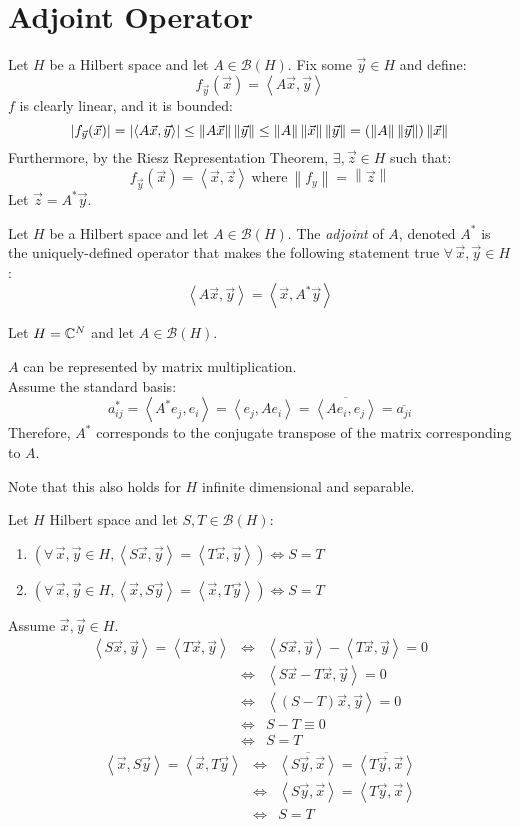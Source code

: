 \documentclass[letterpaper,12pt,fleqn]{article}
\newcommand{\mb}{\mathcal{B}}
\newcommand{\vx}{\vec{x}}
\newcommand{\vy}{\vec{y}}
\newcommand{\vz}{\vec{z}}
\newcommand{\norm}[1]{\left\|#1\right\|}
\newcommand{\inner}[1]{\left<#1\right>}
\newcommand{\conj}[1]{\overline{#1}}
\begin{document}
\section*{Adjoint Operator}

Let $H$ be a Hilbert space and let $A\in\mb(H)$. Fix some $\vy\in H$ and
define:
\[f_{\vy}(\vx)=\inner{A\vx,\vy}\]
$f$ is clearly linear, and it is bounded:
\[\abs{f_{\vy}(\vx)}=\abs{\inner{A\vx,\vy}}\le\norm{A\vx}\norm{\vy}\le
\norm{A}\norm{\vx}\norm{\vy}=(\norm{A}\norm{\vy})\norm{\vx}\]
Furthermore, by the Riesz Representation Theorem, $\exists,\vz\in H$ such
that:
\[f_{\vy}(\vx)=\inner{\vx,\vz}\ \mbox{where}\ \norm{f_y}=\norm{\vz}\]
Let $\vz=A^*\vy$.

\begin{definition}
  Let $H$ be a Hilbert space and let $A\in\mb(H)$. The \emph{adjoint} of $A$,
  denoted $A^*$ is the uniquely-defined operator that makes the following
  statement true $\forall\,\vx,\vy\in H$:
  \[\inner{A\vx,\vy}=\inner{\vx,A^*\vy}\]
\end{definition}

\begin{example}
  Let $H=\mathbb{C}^N$ and let $A\in\mb(H)$.

  $A$ can be represented by matrix multiplication. \\
  Assume the standard basis:
  \[a_{ij}^*=\inner{A^*e_j,e_i}=\inner{e_j,Ae_i}=\conj{\inner{Ae_i,e_j}}=
  \conj{a_{ji}}\]
  Therefore, $A^*$ corresponds to the conjugate transpose of the matrix
  corresponding to $A$.

  Note that this also holds for $H$ infinite dimensional and separable.
\end{example}

\begin{lemma}
  Let $H$ Hilbert space and let $S,T\in\mb(H)$:
  \begin{enumerate}
  \item $\left(\forall\,\vx,\vy\in H,\inner{S\vx,\vy}=\inner{T\vx,\vy}\right)
    \iff S=T$
  \item $\left(\forall\,\vx,\vy\in H,\inner{\vx,S\vy}=\inner{\vx,T\vy}\right)
    \iff S=T$
  \end{enumerate}
\end{lemma}

\begin{theproof}
  Assume $\vx,\vy\in H$.
  \begin{eqnarray*}
    \inner{S\vx,\vy}=\inner{T\vx,\vy} &\iff&
    \inner{S\vx,\vy}-\inner{T\vx,\vy}=0 \\
    &\iff& \inner{S\vx-T\vx,\vy}=0 \\
    &\iff& \inner{(S-T)\vx,\vy}=0 \\
    &\iff& S-T\equiv0 \\
    &\iff& S=T
  \end{eqnarray*}
  \begin{eqnarray*}
    \inner{\vx,S\vy}=\inner{\vx,T\vy} &\iff&
    \conj{\inner{S\vy,\vx}}=\conj{\inner{T\vy,\vx}} \\
    &\iff& \inner{S\vy,\vx}=\inner{T\vy,\vx} \\
    &\iff& S=T
  \end{eqnarray*}
\end{theproof}
\end{document}
